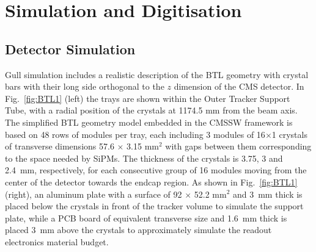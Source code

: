 \section{Simulation and Digitisation}

\subsection{Detector Simulation}


Gull simulation includes a realistic description of the BTL geometry with crystal bars with their long side orthogonal to the $z$ dimension of the CMS detector. In Fig.~\ref{fig:BTL1} (left) the trays are shown within the Outer Tracker Support Tube, with a radial position of the crystals at 1174.5 mm from the beam axis. The simplified BTL geometry model embedded in the CMSSW framework is based on 48 rows of modules per tray, each including 3 modules of 16$\times$1 crystals of transverse dimensions 57.6 $\times$ 3.15 mm$^2$ with gaps between them corresponding to the space needed by SiPMs. The thickness of the crystals is 3.75, 3 and 2.4~mm, respectively, for each consecutive group of 16 modules moving from the center of the detector towards the endcap region. As shown in Fig.~\ref{fig:BTL1} (right), an aluminum plate with a surface of 92 $\times$ 52.2 mm$^2$ and 3~mm thick is placed below the crystals in front of the tracker volume to simulate the support plate, while a PCB board of equivalent transverse size and 1.6~mm thick is placed 3~mm above the crystals to approximately simulate the readout electronics material budget.

